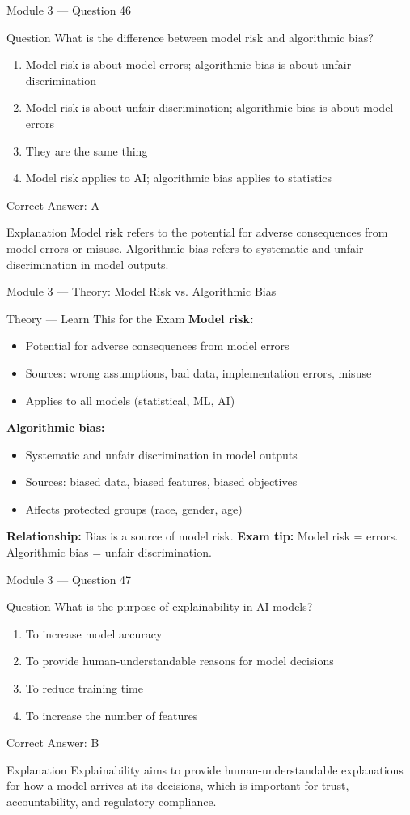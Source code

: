 \documentclass[aspectratio=169,10pt]{beamer}
\newcommand{\question}[1]{%
	\begin{block}{Question}
		#1
	\end{block}
}
\newcommand{\options}[4]{%
	\begin{enumerate}[label=\Alph*.,leftmargin=*]
		\item #1
		\item #2
		\item #3
		\item #4
	\end{enumerate}
}
\newcommand{\answerbox}[1]{%
	\begin{exampleblock}{Correct Answer: #1}
	\end{exampleblock}
}
\newcommand{\explain}[1]{%
	\begin{block}{Explanation}
		\small #1
	\end{block}
}
\newcommand{\theory}[1]{%
	\begin{block}{Theory --- Learn This for the Exam}
		\small #1
	\end{block}
}
\begin{document}
	\begin{frame}{Module 3 --- Question 46}
		\question{What is the difference between model risk and algorithmic bias?}
		\options{Model risk is about model errors; algorithmic bias is about unfair discrimination}{Model risk is about unfair discrimination; algorithmic bias is about model errors}{They are the same thing}{Model risk applies to AI; algorithmic bias applies to statistics}
		\answerbox{A}
		\explain{Model risk refers to the potential for adverse consequences from model errors or misuse. Algorithmic bias refers to systematic and unfair discrimination in model outputs.}
	\end{frame}
	
	\begin{frame}{Module 3 --- Theory: Model Risk vs. Algorithmic Bias}
		\theory{
			\textbf{Model risk:}
			\begin{itemize}
				\item Potential for adverse consequences from model errors
				\item Sources: wrong assumptions, bad data, implementation errors, misuse
				\item Applies to all models (statistical, ML, AI)
			\end{itemize}
			\textbf{Algorithmic bias:}
			\begin{itemize}
				\item Systematic and unfair discrimination in model outputs
				\item Sources: biased data, biased features, biased objectives
				\item Affects protected groups (race, gender, age)
			\end{itemize}
			\textbf{Relationship:} Bias is a source of model risk.
			\textbf{Exam tip:} Model risk = errors. Algorithmic bias = unfair discrimination.
		}
	\end{frame}
	
	\begin{frame}{Module 3 --- Question 47}
		\question{What is the purpose of explainability in AI models?}
		\options{To increase model accuracy}{To provide human-understandable reasons for model decisions}{To reduce training time}{To increase the number of features}
		\answerbox{B}
		\explain{Explainability aims to provide human-understandable explanations for how a model arrives at its decisions, which is important for trust, accountability, and regulatory compliance.}
	\end{frame}
	
\end{document}
